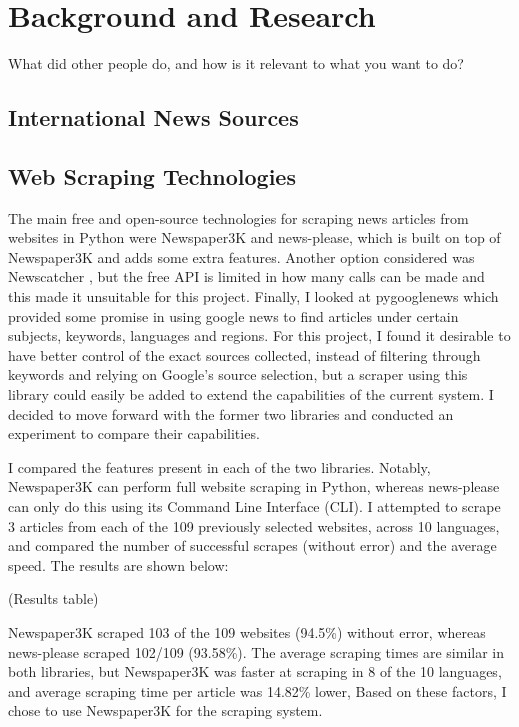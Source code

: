 \documentclass{l4proj}
\begin{document}
\chapter{Background and Research}
What did other people do, and how is it relevant to what you want to do?
\section{International News Sources}
\section{Web Scraping Technologies}
The main free and open-source technologies for scraping news articles from websites in Python were Newspaper3K and news-please, which is built on top of Newspaper3K and adds some extra features. \citep{newspaper3k, news-please} Another option considered was Newscatcher \citep{newscatcher}, but the free API is limited in how many calls can be made and this made it unsuitable for this project. Finally, I looked at pygooglenews \citep{pygooglenews} which provided some promise in using google news to find articles under certain subjects, keywords, languages and regions. For this project, I found it desirable to have better control of the exact sources collected, instead of filtering through keywords and relying on Google's source selection, but a scraper using this library could easily be added to extend the capabilities of the current system. I decided to move forward with the former two libraries and conducted an experiment to compare their capabilities. \par

I compared the features present in each of the two libraries. Notably, Newspaper3K can perform full website scraping in Python, whereas news-please can only do this using its Command Line Interface (CLI). I attempted to scrape 3 articles from each of the 109 previously selected websites, across 10 languages, and compared the number of successful scrapes (without error) and the average speed. The results are shown below: \par 
(Results table) \par
Newspaper3K scraped 103 of the 109 websites (94.5\%) without error, whereas news-please scraped 102/109 (93.58\%). The average scraping times are similar in both libraries, but Newspaper3K was faster at scraping in 8 of the 10 languages, and average scraping time per article was 14.82\% lower, Based on these factors, I chose to use Newspaper3K for the scraping system.
\end{document}
